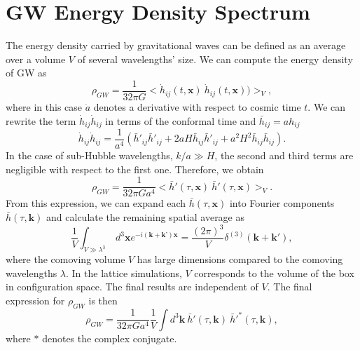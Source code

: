 \documentclass[11pt,a4paper,twoside]{book}
\begin{document}
\section{GW Energy Density Spectrum}
The energy density carried by  gravitational waves can be defined as an average over a volume $ V $ of several wavelengths' size. We can compute the energy density of GW as 
\begin{equation}
\label{Chap7:energyDensityGWs}
\rho_{GW}=\frac{1}{32\pi G}<\dot{h}_{ij}(t,\textbf{x})\ \dot{h}_{ij}(t,\textbf{x}))>_{V},
\end{equation}
where in this case $ \dot{a} $ denotes a derivative with respect to cosmic time $ t $. We can rewrite the term $ \dot{h}_{ij}\dot{h}_{ij} $ in terms of the conformal time and $ \bar{h}_{ij}= a h_{ij} $
\begin{equation}
\label{Chap7:hConformalTime}
\dot{h}_{ij} \dot{h}_{ij} = \frac{1}{a^{4}}(\bar{h}'_{ij} \bar{h}'_{ij} + 2aH \bar{h}_{ij} \bar{h}'_{ij}+ a^{2}H^{2} \bar{h}_{ij} \bar{h}_{ij}).
\end{equation}
In the case of sub-Hubble wavelengths, $ k/a \gg H $,  the second and third terms are negligible with respect to the first one. Therefore, we obtain
\begin{equation}
\label{Chap7:energyDensity2}
\rho_{GW} = \frac{1}{32\pi G a^{4}} <\bar{h}'(\tau,\textbf{x})\ \bar{h}'(\tau,\textbf{x})>_{V}.
\end{equation}
From this expression, we can expand each $ \bar{h}(\tau,\textbf{x}) $ into Fourier components $ \bar{h}(\tau,\textbf{k}) $ and calculate the remaining spatial average as
\begin{equation}
\label{Chap7:spatialAverage}
\frac{1}{V}\int_{V \gg \lambda^{3}}\ d^{3}\textbf{x}e^{-i(\textbf{k} + \textbf{k'})\textbf{x}} = \frac{(2\pi)^{3}}{V}\delta^{(3)}(\textbf{k} + \textbf{k}'),
\end{equation}
where the comoving volume $ V $ has large dimensions compared to the comoving wavelengths $\lambda$. In the lattice simulations, $ V $ corresponds to the volume of the box in configuration space. The final results are independent of $ V $. The final expression for $\rho_{GW}$ is then
\begin{equation}
\label{Chap7:energyDensity}
\rho_{GW}=\frac{1}{32\pi G a^{4}}\frac{1}{V}\int d^{3}\textbf{k}\ \bar{h}'(\tau,\textbf{k})\ \bar{h}'^{*}(\tau,\textbf{k}),
\end{equation}
where $*$ denotes the complex conjugate.
\end{document}
